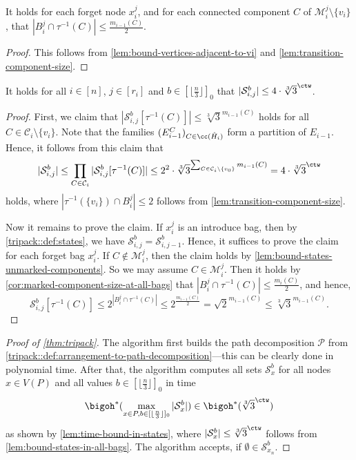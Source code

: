 \documentclass[a4paper,UKenglish,cleveref, autoref, thm-restate]{lipics-v2021}
\begin{document}
\begin{corollary}\label{cor:marked-component-size-at-all-bags}
    It holds for each forget node $x_i^j$, and for each connected component $C$ of $\mathcal{M}_i^j \setminus \{v_i\}$, that $|B_i^j \cap \tau^{-1}(C)| \leq \frac{m_{i-1}(C)}{2}$.
\end{corollary}

\begin{proof}
    This follows from \cref{lem:bound-vertices-adjacent-to-vi} and \cref{lem:transition-component-size}.
\end{proof}

\begin{lemma}\label{lem:bound-states-in-all-bags}
    It holds for all $i\in[n]$, $j\in [r_i]$ and $b\in [\lfloor\frac{n}{3}\rfloor]_0$ that $|\mathcal{S}_{i,j}^b| \leq 4\cdot\sqrt[3]{3}^{\ctw}$.
\end{lemma}

\begin{proof}
    First, we claim that $|\mathcal{S}_{i,j}^b[\tau^{-1}(C)]|\leq \sqrt[3]{3}^{m_{i-1}(C)}$ holds for all $C\in \mathcal{C}_i\setminus \{v_i\}$.
    Note that the families $(E_{i-1}^C)_{C\in\cc(\hat{H}_i)}$ form a partition of $E_{i-1}$. Hence, it follows from this claim that
    \[|\mathcal{S}_{i,j}^b| 
    \leq \prod\limits_{C \in \mathcal{C}_i} |\mathcal{S}_{i,j}^b[\tau^{-1}(C)]|
    \leq 2^2\cdot \sqrt[3]{3}^{\sum_{C\in \mathcal{C}_i\setminus \{v_0\}} m_{i-1}(C)} 
    = 4\cdot\sqrt[3]{3}^{\ctw}\]
    holds, where $|\tau^{-1}(\{v_i\})\cap B_i^j| \leq 2$ follows from \cref{lem:transition-component-size}.

    Now it remains to prove the claim.
    If $x_i^j$ is an introduce bag, then by \cref{tripack::def:states}, we have $\mathcal{S}_{i,j}^b = \mathcal{S}_{i,j-1}^b$. 
    Hence, it suffices to prove the claim for each forget bag $x_i^j$. If $C \notin \mathcal{M}_i^j$, then the claim holds by \cref{lem:bound-states-unmarked-components}. 
    So we may assume $C\in \mathcal{M}_i^j$. 
    Then it holds by \cref{cor:marked-component-size-at-all-bags} that $|B_i^j \cap \tau^{-1}(C)| \leq \frac{m_i(C)}{2}$, and hence,
    \[
    \mathcal{S}_{i,j}^b[\tau^{-1}(C)] \leq 2^{|B_i^j\cap \tau^{-1}(C)|} \leq 2^{\frac{m_{i-1}(C)}{2}} = \sqrt{2}^{m_{i-1}(C)} \leq \sqrt[3]{3}^{m_{i-1}(C)}.
    \]
\end{proof}

\begin{proof}[Proof of \cref{thm:tripack}]
    The algorithm first builds the path decomposition $\mathcal{P}$ from \cref{tripack::def:arrangement-to-path-decomposition}---this can be clearly done in polynomial time. 
    After that, the algorithm computes all sets 
    $\mathcal{S}_x^b$ for all nodes $x\in V(P)$ and all values $b\in [\lfloor\frac{n}{3}\rfloor]_0$ in time 
    \[
    	\bigoh^*(\max_{x \in P, b\in [\lfloor\frac{n}{3}\rfloor]_0} |\mathcal{S}_x^b|) \in \bigoh^*(\sqrt[3]{3}^{\ctw})
     \]
     as shown by \cref{lem:time-bound-in-states}, where $|\mathcal{S}^b_x| \leq \sqrt[3]{3}^{\ctw}$ follows from \cref{lem:bound-states-in-all-bags}.
    The algorithm accepts, if $\emptyset \in \mathcal{S}_{x_n}^b$.
\end{proof}
\end{document}
